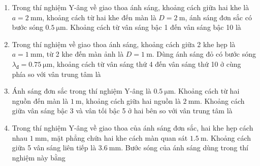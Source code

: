 \begin{enumerate}
{	
	}
	\item
	{
		Trong thí nghiệm Y-âng về giao thoa ánh sáng, khoảng cách giữa hai khe là $a=\SI{2}{\milli \meter}$, khoảng cách từ hai khe đến màn là $D=\SI{2}{\meter}$, ánh sáng đơn sắc có bước sóng $\SI{0.5}{\micro \meter}$. Khoảng cách từ vân sáng bậc 1 đến vân sáng bậc 10 là
	}
	\item
	{
		Trong thí nghiệm về giao thoa ánh sáng, khoảng cách giữa 2 khe hẹp là $a=\SI{1}{\milli \meter}$, từ 2 khe đến màn ảnh là $D=\SI{1}{\meter}$. Dùng ánh sáng đỏ có bước sóng $\lambda_\text{đ}=\SI{0.75}{\micro \meter}$, khoảng cách từ vân sáng thứ 4 đến vân sáng thứ 10 ở cùng phía so với vân trung tâm là
	}
	\item
	{
		Ánh sáng đơn sắc trong thí nghiệm Y-âng là $\SI{0.5}{\micro \meter}$. Khoảng cách từ hai nguồn đến màn là $\SI{1}{\meter}$, khoảng cách giữa hai nguồn là $\SI{2}{\milli \meter}$. Khoảng cách giữa vân sáng bậc 3 và vân tối bậc 5 ở hai bên so với vân trung tâm là
	}
	\item
	{
	Trong thí nghiệm Y-âng về giao thoa của ánh sáng đơn sắc, hai khe hẹp cách nhau $\SI{1}{\milli \meter}$, mặt phẳng chứa hai khe cách màn quan sát $\SI{1.5}{\meter}$. Khoảng cách giữa 5 vân sáng liên tiếp là $\SI{3.6}{\milli \meter}$. Bước sóng của ánh sáng dùng trong thí nghiệm này bằng
}
\end{enumerate}
